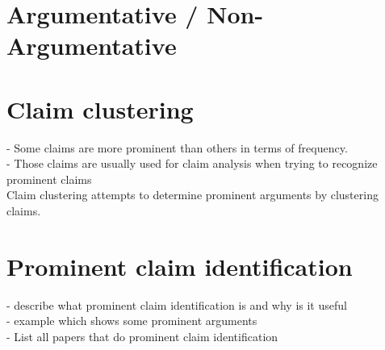 \section{Argumentative / Non-Argumentative}

\section{Claim clustering}

- Some claims are more prominent than others in terms of frequency.  \\
- Those claims are usually used for claim analysis when trying to recognize 
prominent claims \\
Claim clustering attempts to determine prominent arguments  
by clustering claims. \\

\section{Prominent claim identification}

- describe what prominent claim identification is and why is it useful \\
- example which shows some prominent arguments \\
- List all papers that do prominent claim identification \\
